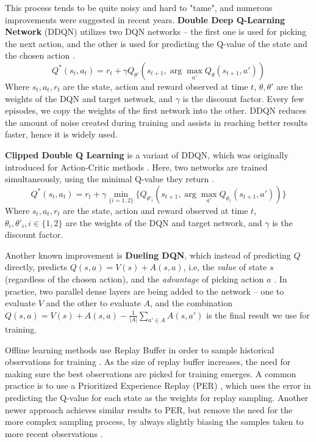 \documentclass{article}
\begin{document}
\begin{multicols}{2}
This process tends to be quite noisy and hard to "tame", and numerous improvements were suggested in recent years. \textbf{Double Deep Q-Learning Network} (DDQN) utilizes two DQN networks -- the first one is used for picking the next action, and the other is used for predicting the Q-value of the state and the chosen action \cite{DDQN}. 
$$Q^*(s_t, a_t) = r_t + \gamma Q_{\theta'}(s_{t+1}, \arg \max_{a'}Q_{\theta}(s_{t+1}, a'))$$
Where $s_t, a_t, r_t$ are the state, action and reward observed at time $t$, $\theta, \theta'$ are the weights of the DQN and target network, and $\gamma$ is the discount factor.
Every few episodes, we copy the weights of the first network into the other. DDQN reduces the amount of noise created during training and assists in reaching better results faster, hence it is widely used.

\textbf{Clipped Double Q Learning} is a variant of DDQN, which was originally introduced for Action-Critic methods \cite{ClippedDQN}. Here, two networks are trained simultaneously, using the minimal Q-value they return \cite{ren2021on}. 
$$Q^*(s_t, a_t) = r_t + \gamma \min_{\{i = 1, 2\}} \{Q_{\theta'_i}(s_{t+1}, \arg \max_{a'}Q_{\theta_1}(s_{t+1}, a'))\}$$
Where $s_t, a_t, r_t$ are the state, action and reward observed at time $t$, $\theta_i,  \theta'_i, i\in \{1,2\}$ are the weights of the DQN and target network, and $\gamma$ is the discount factor.

Another known improvement is \textbf{Dueling DQN}, which instead of predicting $Q$ directly, predicts $Q(s,a)=V(s)+A(s,a)$, i.e, the \textit{value} of state $s$ (regardless of the chosen action), and the \textit{advantage} of picking action $a$ \cite{DuelingDQN}. In practice, two parallel dense layers are being added to the network -- one to evaluate $V$ and the other to evaluate $A$, and the combination $Q(s,a)=V(s)+A(s,a) - \frac1{|A|}\sum_{a'\in A}A(s,a')$ is the final result we use for training.

Offline learning methods use Replay Buffer in order to sample historical observations for training \cite{DQN}. As the size of replay buffer increases, the need for making sure the best observations are picked for training emerges. A common practice is to use a Prioritized Experience Replay (PER) \cite{PER}, which uses the error in predicting the Q-value for each state as the weights for replay sampling. Another newer approach achieves similar results to PER, but remove the need for the more complex sampling process, by always slightly biasing the samples taken to more recent observations \cite{ExpReplay}.


\end{multicols}
\end{document}
